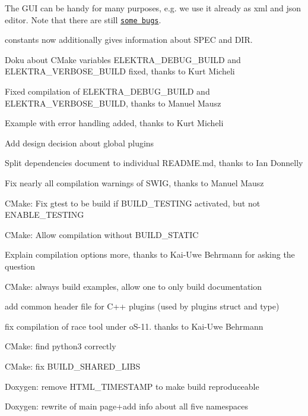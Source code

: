 The G\+UI can be handy for many purposes, e.\+g. we use it already as xml and json editor. Note that there are still \href{https://git.libelektra.org/issues}{\tt some bugs}.


\begin{DoxyItemize}
\item constants now additionally gives information about S\+P\+EC and D\+IR.
\item Doku about C\+Make variables {\ttfamily E\+L\+E\+K\+T\+R\+A\+\_\+\+D\+E\+B\+U\+G\+\_\+\+B\+U\+I\+LD} and {\ttfamily E\+L\+E\+K\+T\+R\+A\+\_\+\+V\+E\+R\+B\+O\+S\+E\+\_\+\+B\+U\+I\+LD} fixed, thanks to Kurt Micheli
\item Fixed compilation of {\ttfamily E\+L\+E\+K\+T\+R\+A\+\_\+\+D\+E\+B\+U\+G\+\_\+\+B\+U\+I\+LD} and {\ttfamily E\+L\+E\+K\+T\+R\+A\+\_\+\+V\+E\+R\+B\+O\+S\+E\+\_\+\+B\+U\+I\+LD}, thanks to Manuel Mausz
\item Example with error handling added, thanks to Kurt Micheli
\item Add design decision about global plugins
\item Split dependencies document to individual R\+E\+A\+D\+M\+E.\+md, thanks to Ian Donnelly
\item Fix nearly all compilation warnings of S\+W\+IG, thanks to Manuel Mausz
\item C\+Make\+: Fix gtest to be build if {\ttfamily B\+U\+I\+L\+D\+\_\+\+T\+E\+S\+T\+I\+NG} activated, but not {\ttfamily E\+N\+A\+B\+L\+E\+\_\+\+T\+E\+S\+T\+I\+NG}
\item C\+Make\+: Allow compilation without B\+U\+I\+L\+D\+\_\+\+S\+T\+A\+T\+IC
\item Explain compilation options more, thanks to Kai-\/\+Uwe Behrmann for asking the question
\item C\+Make\+: always build examples, allow one to only build documentation
\item add common header file for C++ plugins (used by plugins struct and type)
\item fix compilation of race tool under o\+S-\/11. thanks to Kai-\/\+Uwe Behrmann
\item C\+Make\+: find python3 correctly
\item C\+Make\+: fix B\+U\+I\+L\+D\+\_\+\+S\+H\+A\+R\+E\+D\+\_\+\+L\+I\+BS
\item Doxygen\+: remove {\ttfamily H\+T\+M\+L\+\_\+\+T\+I\+M\+E\+S\+T\+A\+MP} to make build reproduceable
\item Doxygen\+: rewrite of main page+add info about all five namespaces

\end{DoxyItemize}
